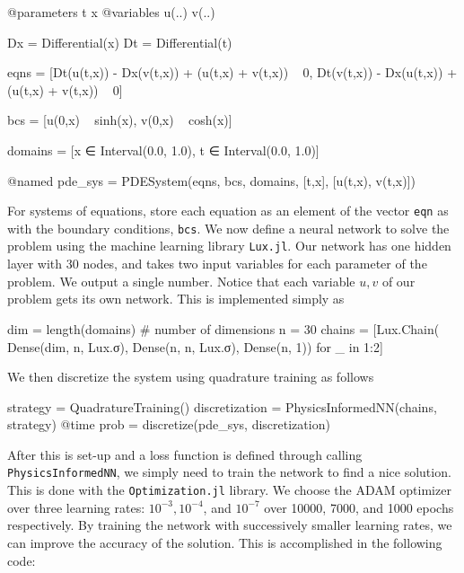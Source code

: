 \documentclass{CUP-JNL-DTM}%
\theoremstyle{definition}
\numberwithin{equation}{section}
\begin{document}
\begin{jllisting}
@parameters t x
@variables u(..) v(..)

Dx = Differential(x)
Dt = Differential(t)

eqns = [Dt(u(t,x)) - Dx(v(t,x)) + (u(t,x) + v(t,x)) ~ 0,
        Dt(v(t,x)) - Dx(u(t,x)) + (u(t,x) + v(t,x)) ~ 0]

bcs = [u(0,x) ~ sinh(x), v(0,x) ~ cosh(x)]

domains = [x ∈ Interval(0.0, 1.0),
            t ∈ Interval(0.0, 1.0)]

@named pde_sys = PDESystem(eqns, bcs, domains, [t,x], [u(t,x), v(t,x)])
\end{jllisting}
For systems of equations, store each equation as an element of the vector \texttt{eqn} as with the boundary conditions, \texttt{bcs}. We now define a neural network to solve the problem using the machine learning library \texttt{Lux.jl}. Our network has one hidden layer with 30 nodes, and takes two input variables for each parameter of the problem. We output a single number. Notice that each variable $u,v$ of our problem gets its own network. This is implemented simply as

\begin{jllisting}
dim = length(domains) # number of dimensions
n = 30
chains = [Lux.Chain(
            Dense(dim, n, Lux.σ), 
            Dense(n, n, Lux.σ), 
            Dense(n, 1)) for _ in 1:2]
\end{jllisting}
We then discretize the system using quadrature training as follows

\begin{jllisting}
strategy = QuadratureTraining()
discretization = PhysicsInformedNN(chains, strategy)
@time prob = discretize(pde_sys, discretization)
\end{jllisting}
After this is set-up and a loss function is defined through calling \texttt{PhysicsInformedNN}, we simply need to train the network to find a nice solution. This is done with the \texttt{Optimization.jl} library. We choose the ADAM optimizer over three learning rates: $10^{-3}, 10^{-4}$, and $10^{-7}$ over 10000, 7000, and 1000 epochs respectively. By training the network with successively smaller learning rates, we can improve the accuracy of the solution. This is accomplished in the following code:
\end{document}
